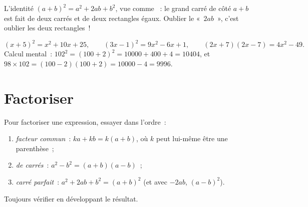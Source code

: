 \begin{omfigure}

{\small L'identité $(a+b)^2 = a^2 + 2ab + b^2$, vue comme ~: le
grand carré de côté $a+b$ est fait de deux carrés et de deux rectangles
égaux. Oublier le «~$2ab$~», c'est oublier les deux rectangles~!}
\end{omfigure}

\begin{example}\label{ex:g9:algebra:identities}
\[
(x + 5)^2 = x^2 + 10x + 25, \qquad
(3x - 1)^2 = 9x^2 - 6x + 1, \qquad
(2x + 7)(2x - 7) = 4x^2 - 49 .
\]
Calcul mental~: $102^2 = (100 + 2)^2 = 10000 + 400 + 4 = 10404$, et
$98 \times 102 = (100-2)(100+2) = 10000 - 4 = 9996$.
\end{example}

\section{Factoriser}

\begin{method}[Factoriser]\label{met:g9:algebra:factor}
Pour factoriser une expression, essayer dans l'ordre~:
\begin{enumerate}
  \item \emph{facteur commun}~: $ka + kb = k(a + b)$, où $k$ peut
        lui-même être une parenthèse~;
  \item \emph{ de carrés}~: $a^2 - b^2 = (a+b)(a-b)$~;
  \item \emph{carré parfait}~: $a^2 + 2ab + b^2 = (a+b)^2$ (et avec
        $-2ab$, $(a-b)^2$).
\end{enumerate}
Toujours vérifier en développant le résultat.
\end{method}

